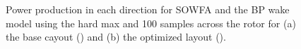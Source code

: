 \documentclass[conf]{new-aiaa}
\begin{document}
\begin{figure}[ht]
	\centering
	\caption{Power production in each direction for SOWFA and the BP wake model using the hard max and 100 samples across the rotor for (a) the base cayout () and (b) the optimized layout ().}
	\label{fig:dir-power}
\end{figure}
\end{document}
